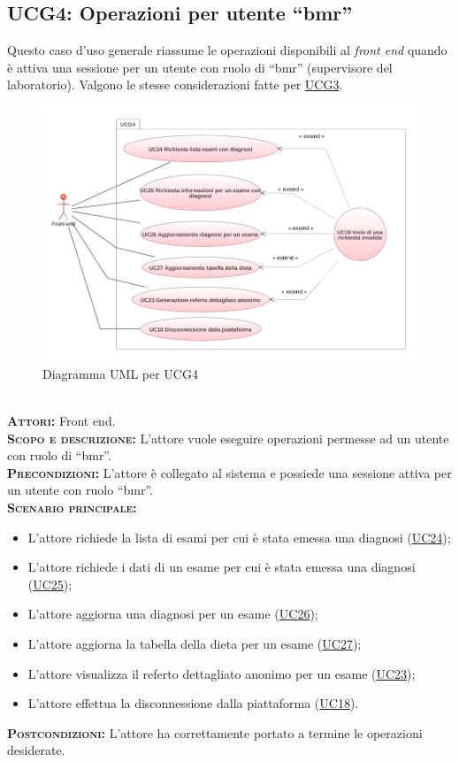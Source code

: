 \subsection{UCG4: Operazioni per utente ``bmr''}
\label{sec:UCG4}
Questo caso d'uso generale riassume le operazioni disponibili al \textit{front end} quando è attiva una sessione per un utente con ruolo di ``bmr'' (supervisore del laboratorio). Valgono le stesse considerazioni fatte per \hyperref[sec:UCG3]{UCG3}.
\begin{figure}[h!]
    \centering
    \includegraphics[width=\textwidth]{figures/uc/ucg4.png}
    \caption[Diagramma UML per UCG4]{Diagramma UML per UCG4
    \label{fig:ucg4}}
\end{figure}\\
\textsc{\textbf{Attori:}} Front end.\\
\textsc{\textbf{Scopo e descrizione:}} L'attore vuole eseguire operazioni permesse ad un utente con ruolo di ``bmr''.\\
\textsc{\textbf{Precondizioni:}} L'attore è collegato al sistema e possiede una sessione attiva per un utente con ruolo ``bmr''.\\
\textsc{\textbf{Scenario principale:}} 
\begin{itemize}
    \item L'attore richiede la lista di esami per cui è stata emessa una diagnosi (\hyperref[sec:UC24]{UC24});
    \item L'attore richiede i dati di un esame per cui è stata emessa una diagnosi (\hyperref[sec:UC25]{UC25});
    \item L'attore aggiorna una diagnosi per un esame (\hyperref[sec:UC26]{UC26});
    \item L'attore aggiorna la tabella della dieta per un esame (\hyperref[sec:UC27]{UC27});
    \item L'attore visualizza il referto dettagliato anonimo per un esame (\hyperref[sec:UC23]{UC23});
    \item L'attore effettua la disconnessione dalla piattaforma (\hyperref[sec:UC18]{UC18}).
\end{itemize}
\textsc{\textbf{Postcondizioni:}} L'attore ha correttamente portato a termine le operazioni desiderate.


